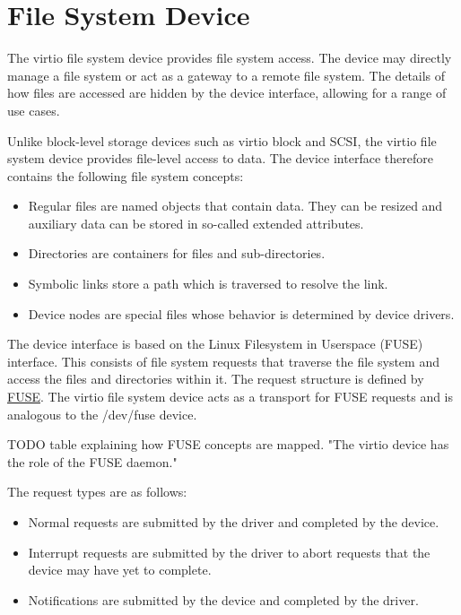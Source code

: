 \section{File System Device}\label{sec:Device Types / File System Device}

The virtio file system device provides file system access.  The device may
directly manage a file system or act as a gateway to a remote file system.  The
details of how files are accessed are hidden by the device interface, allowing
for a range of use cases.

Unlike block-level storage devices such as virtio block and SCSI, the virtio
file system device provides file-level access to data.  The device interface
therefore contains the following file system concepts:
\begin{itemize}
\item Regular files are named objects that contain data.  They can be resized
      and auxiliary data can be stored in so-called extended attributes.
\item Directories are containers for files and sub-directories.
\item Symbolic links store a path which is traversed to resolve the link.
\item Device nodes are special files whose behavior is determined by device
      drivers.
\end{itemize}

The device interface is based on the Linux Filesystem in Userspace (FUSE)
interface.  This consists of file system requests that traverse the file system
and access the files and directories within it.  The request structure is
defined by \hyperref[intro:FUSE]{FUSE}.  The virtio file system device acts as
a transport for FUSE requests and is analogous to the /dev/fuse device.

TODO table explaining how FUSE concepts are mapped.  "The virtio device has the role of the FUSE daemon."

The request types are as follows:
\begin{itemize}
\item Normal requests are submitted by the driver and completed by the device.
\item Interrupt requests are submitted by the driver to abort requests that the
      device may have yet to complete.
\item Notifications are submitted by the device and completed by the driver.
\end{itemize}

